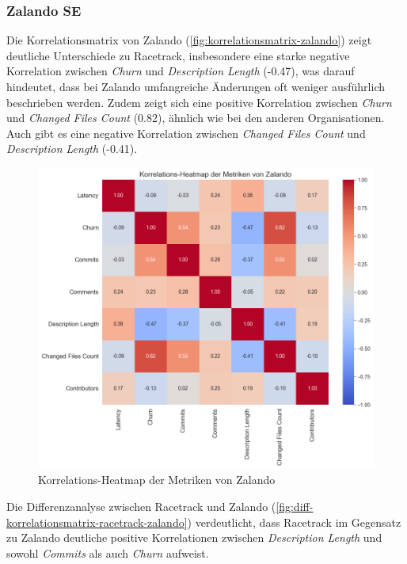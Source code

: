 \newpage

\subsubsection{Zalando SE}
Die Korrelationsmatrix von Zalando (\autoref{fig:korrelationsmatrix-zalando}) zeigt deutliche Unterschiede zu Racetrack, insbesondere eine starke negative Korrelation zwischen \textit{Churn} und \textit{Description Length} (-0.47), was darauf hindeutet, dass bei Zalando umfangreiche Änderungen oft weniger ausführlich beschrieben werden. Zudem zeigt sich eine positive Korrelation zwischen \textit{Churn} und \textit{Changed Files Count} (0.82), ähnlich wie bei den anderen Organisationen. Auch gibt es eine negative Korrelation zwischen \textit{Changed Files Count} und \textit{Description Length} (-0.41).

\begin{figure}[htbp]
    \includegraphics[width=\textwidth]{Figures/zalando-korrelationsmatrix.png}
    \caption{Korrelations-Heatmap der Metriken von Zalando}
    \label{fig:korrelationsmatrix-zalando}
\end{figure}

\newpage
Die Differenzanalyse zwischen Racetrack und Zalando (\autoref{fig:diff-korrelationsmatrix-racetrack-zalando}) verdeutlicht, dass Racetrack im Gegensatz zu Zalando deutliche positive Korrelationen zwischen \textit{Description Length} und sowohl \textit{Commits} als auch \textit{Churn} aufweist.

